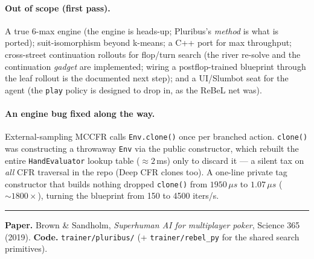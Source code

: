 \documentclass[11pt,a4paper]{article}
\newcommand{\file}[1]{\textcolor{accent}{\texttt{#1}}}
\begin{document}
\paragraph{Out of scope (first pass).} A true 6-max engine (the engine is
heads-up; Pluribus's \emph{method} is what is ported); suit-isomorphism beyond
k-means; a C++ port for max throughput; cross-street continuation rollouts for
flop/turn search (the river re-solve and the continuation \emph{gadget} are
implemented; wiring a postflop-trained blueprint through the leaf rollout is the
documented next step); and a UI/Slumbot seat for the agent (the \file{play}
policy is designed to drop in, as the ReBeL net was).

\paragraph{An engine bug fixed along the way.} External-sampling MCCFR calls
\texttt{Env.clone()} once per branched action. \texttt{clone()} was constructing a
throwaway \texttt{Env} via the public constructor, which rebuilt the entire
\texttt{HandEvaluator} lookup table ($\approx 2$\,ms) only to discard it --- a
silent tax on \emph{all} CFR traversal in the repo (Deep CFR clones too). A
one-line private tag constructor that builds nothing dropped \texttt{clone()} from
$1950\,\mu s$ to $1.07\,\mu s$ ($\sim 1800\times$), turning the blueprint from
150 to 4500 iters/s.

\vspace{4mm}\hrule\vspace{2mm}
{\small \textbf{Paper.} Brown \& Sandholm, \emph{Superhuman AI for multiplayer
poker}, Science 365 (2019). \quad \textbf{Code.} \file{trainer/pluribus/} (+
\file{trainer/rebel\_py} for the shared search primitives).}
\end{document}
